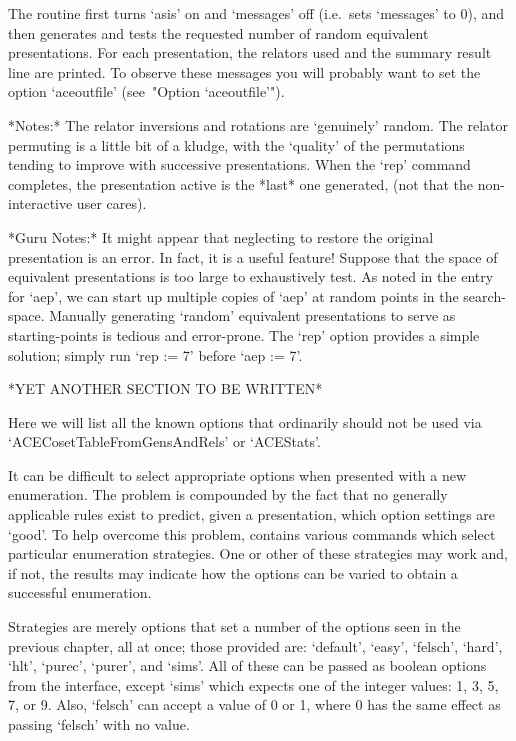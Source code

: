 The routine first  turns  `asis'  on  and  `messages'  off  (i.e.~sets
`messages' to 0), and then generates and tests the requested number of
random equivalent presentations. For each  presentation, the  relators
used and the  summary  result  line  are  printed.  To  observe  these
messages you  will  probably  want  to  set  the  option  `aceoutfile'
(see~"Option `aceoutfile'").

*Notes:*
The relator inversions and rotations are \lq{}genuinely'  random.  The
relator permuting is a little bit of a kludge, with the  \lq{}quality'
of the permutations tending to improve with successive  presentations.
When the `rep' command  completes,  the  presentation  active  is  the
*last* one generated, (not that the non-interactive user cares).

*Guru Notes:*
It might appear that neglecting to restore the  original  presentation
is an error. In fact, it is a useful feature! Suppose that  the  space
of equivalent presentations is too  large  to  exhaustively  test.  As
noted in the entry for `aep', we can start up multiple copies of `aep'
at random points in the  search-space.  Manually  generating  `random'
equivalent presentations to serve as starting-points  is  tedious  and
error-prone. The `rep' option provides a simple solution;  simply  run
`rep := 7' before `aep := 7'.


*YET ANOTHER SECTION TO BE WRITTEN*

Here we will list all the known {\ACE} options that ordinarily  should
not be used via `ACECosetTableFromGensAndRels' or `ACEStats'.


It can be difficult to select appropriate options when presented  with
a new enumeration. The problem is  compounded  by  the  fact  that  no
generally applicable rules exist to  predict,  given  a  presentation,
which option settings are \lq{}good'. To help overcome  this  problem,
{\ACE} contains various commands which select  particular  enumeration
strategies. One or other of these strategies may work and, if not, the
results may indicate how  the  options  can  be  varied  to  obtain  a
successful enumeration.

Strategies are merely options that set a number of the options seen in
the previous chapter, all at  once;  those  provided  are:  `default',
`easy', `felsch', `hard', `hlt', `purec', `purer', and `sims'. All  of
these can be passed as boolean  options  from  the  {\ACE}  interface,
except `sims' which expects one of the integer values: 1, 3, 5, 7,  or
9. Also, `felsch' can accept a value of 0 or 1, where 0 has  the  same
effect as passing `felsch' with no value.

